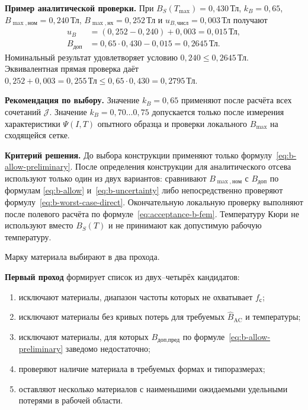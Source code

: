 \documentclass[14pt,a4paper]{extarticle}
\newcommand{\recommend}{\par\noindent\textbf{Рекомендация по выбору.} }
\newcommand{\criterion}{\par\noindent\textbf{Критерий решения.} }
\begin{document}
\textbf{Пример аналитической проверки.}
При $B_S(T_{\max})=0{,}430\,\text{Тл}$, $k_B=0{,}65$,
$B_{\max,\text{ном}}=0{,}240\,\text{Тл}$,
$B_{\max,\text{нх}}=0{,}252\,\text{Тл}$ и
$u_{B,\text{числ}}=0{,}003\,\text{Тл}$ получают
\begin{align}
 u_B&=(0{,}252-0{,}240)+0{,}003
 =0{,}015\,\text{Тл},
 \label{eq:b-uncertainty-example}\\
 B_{\text{доп}}&=
 0{,}65\cdot0{,}430-0{,}015
 =0{,}2645\,\text{Тл}.
 \label{eq:b-allow-example}
\end{align}
Номинальный результат удовлетворяет условию
$0{,}240\leq0{,}2645\,\text{Тл}$. Эквивалентная прямая проверка даёт
$0{,}252+0{,}003=0{,}255\,\text{Тл}
\leq0{,}65\cdot0{,}430=0{,}2795\,\text{Тл}$.

\recommend Значение $k_B=0{,}65$ применяют после расчёта всех сочетаний
$\mathcal J$. Значение $k_B=0{,}70\ldots0{,}75$ допускается только после
измерения характеристики $\Psi(I,T)$ опытного образца и проверки
локального $B_{\max}$ на сходящейся сетке.

\criterion До выбора конструкции применяют только
формулу~\eqref{eq:b-allow-preliminary}. После определения конструкции
для аналитического отсева используют только один из двух вариантов: сравнивают
$B_{\max,\text{ном}}$ с $B_{\text{доп}}$ по формулам
\eqref{eq:b-allow} и~\eqref{eq:b-uncertainty} либо непосредственно
проверяют формулу~\eqref{eq:b-worst-case-direct}. Окончательную локальную
проверку выполняют после полевого расчёта по
формуле~\eqref{eq:acceptance-b-fem}. Температуру Кюри не
используют вместо $B_S(T)$ и не принимают как допустимую рабочую
температуру.

Марку материала выбирают в два прохода.

\textbf{Первый проход} формирует список из двух--четырёх кандидатов:
\begin{enumerate}
 \item исключают материалы, диапазон частоты которых не охватывает
 $f_{\text{с}}$;
 \item исключают материалы без кривых потерь для требуемых
 $\widehat B_{\text{AC}}$ и температуры;
 \item исключают материалы, для которых
 $B_{\text{доп,пред}}$ по формуле~\eqref{eq:b-allow-preliminary}
 заведомо недостаточно;
 \item проверяют наличие материала в требуемых формах и типоразмерах;
 \item оставляют несколько материалов с наименьшими ожидаемыми
 удельными потерями в рабочей области.
\end{enumerate}
\end{document}
